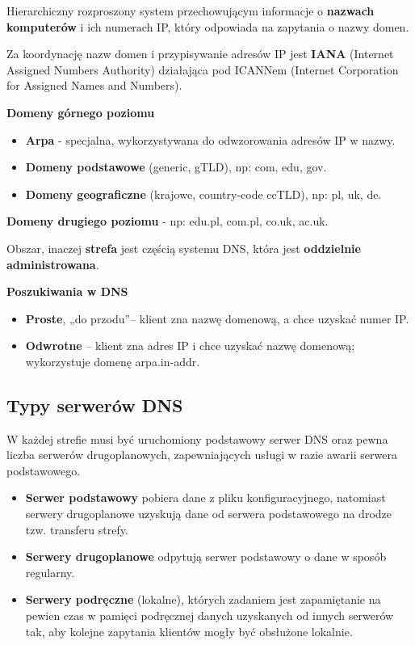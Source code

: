 \documentclass[../main.tex]{subfiles}
\begin{document}
    Hierarchiczny rozproszony system przechowującym informacje o \textbf{nazwach komputerów} i
    ich numerach IP, który odpowiada na zapytania o nazwy domen.

    Za koordynację nazw domen i przypisywanie adresów IP jest \textbf{IANA} (Internet Assigned Numbers
    Authority) działająca pod ICANNem (Internet Corporation for Assigned Names and Numbers).

    \textbf{Domeny górnego poziomu}
    \begin{itemize}
        \item \textbf{Arpa} - specjalna, wykorzystywana do odwzorowania adresów IP w nazwy.
        \item \textbf{Domeny podstawowe} (generic, gTLD), np: com, edu, gov.
        \item \textbf{Domeny geograficzne} (krajowe, country-code ccTLD), np: pl, uk, de.
    \end{itemize}

    \textbf{Domeny drugiego poziomu} - np: edu.pl, com.pl, co.uk, ac.uk.

    Obszar, inaczej \textbf{strefa} jest częścią systemu DNS, która jest \textbf{oddzielnie administrowana}.

    \textbf{Poszukiwania w DNS}
    \begin{itemize}
        \item \textbf{Proste}, „do przodu”– klient zna nazwę domenową, a chce uzyskać numer IP.
        \item \textbf{Odwrotne} – klient zna adres IP i chce uzyskać nazwę domenową; wykorzystuje domenę arpa.in-addr.
    \end{itemize}

    \subsection{Typy serwerów DNS}
    W każdej strefie musi być uruchomiony podstawowy serwer DNS oraz pewna liczba
    serwerów drugoplanowych, zapewniających usługi w razie awarii serwera podstawowego.

    \begin{itemize}
        \item \textbf{Serwer podstawowy} pobiera dane z pliku konfiguracyjnego, natomiast serwery
        drugoplanowe uzyskują dane od serwera podstawowego na drodze tzw. transferu strefy.
        \item \textbf{Serwery drugoplanowe} odpytują serwer podstawowy o dane w sposób
        regularny.
        \item \textbf{Serwery podręczne} (lokalne), których zadaniem jest zapamiętanie na pewien czas w
        pamięci podręcznej danych uzyskanych od innych serwerów tak, aby kolejne zapytania
        klientów mogły być obsłużone lokalnie.
    \end{itemize}
\end{document}
